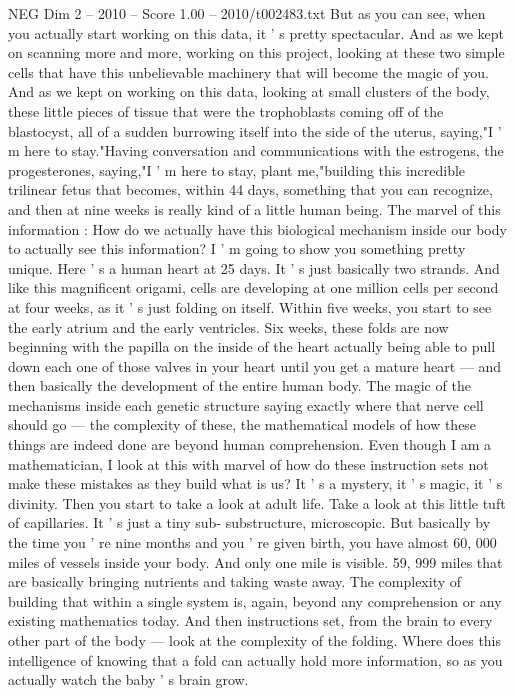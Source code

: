 \begin{textsample}{NEG Dim 2 – 2010 – Score 1.00 – 2010/t002483.txt}
But as you can see, when you actually start working on this data, it ' s pretty spectacular.
And as we kept on scanning more and more, working on this project, looking at these two simple cells that have this unbelievable machinery that will become the magic of you.
And as we kept on working on this data, looking at small clusters of the body, these little pieces of tissue that were the trophoblasts coming off of the blastocyst, all of a sudden burrowing itself into the side of the uterus, saying,"I ' m here to stay."Having conversation and communications with the estrogens, the progesterones, saying,"I ' m here to stay, plant me,"building this incredible trilinear fetus that becomes, within 44 days, something that you can recognize, and then at nine weeks is really kind of a little human being.
The marvel of this information : How do we actually have this biological mechanism inside our body to actually see this information?
I ' m going to show you something pretty unique.
Here ' s a human heart at 25 days.
It ' s just basically two strands.
And like this magnificent origami, cells are developing at one million cells per second at four weeks, as it ' s just folding on itself.
Within five weeks, you start to see the early atrium and the early ventricles.
Six weeks, these folds are now beginning with the papilla on the inside of the heart actually being able to pull down each one of those valves in your heart until you get a mature heart — and then basically the development of the entire human body.
The magic of the mechanisms inside each genetic structure saying exactly where that nerve cell should go — the complexity of these, the mathematical models of how these things are indeed done are beyond human comprehension.
Even though I am a mathematician, I look at this with marvel of how do these instruction sets not make these mistakes as they build what is us?
It ' s a mystery, it ' s magic, it ' s divinity.
Then you start to take a look at adult life.
Take a look at this little tuft of capillaries.
It ' s just a tiny sub- substructure, microscopic.
But basically by the time you ' re nine months and you ' re given birth, you have almost 60, 000 miles of vessels inside your body.
And only one mile is visible. 59, 999 miles that are basically bringing nutrients and taking waste away.
The complexity of building that within a single system is, again, beyond any comprehension or any existing mathematics today.
And then instructions set, from the brain to every other part of the body — look at the complexity of the folding.
Where does this intelligence of knowing that a fold can actually hold more information, so as you actually watch the baby ' s brain grow.

\end{textsample}
